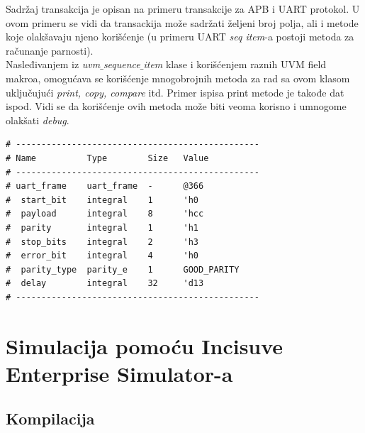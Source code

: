 Sadržaj transakcija je opisan na primeru transakcije za APB i UART protokol.
U ovom primeru se vidi da transackija može sadržati željeni broj polja, ali i
metode koje olakšavaju njeno korišćenje (u primeru UART \emph{seq item}-a
postoji metoda za računanje parnosti).\\





Nasleđivanjem iz \emph{uvm\(\_\)sequence\(\_\)item} klase i korišćenjem raznih
UVM field makroa, omogućava se korišćenje mnogobrojnih metoda za rad sa ovom
klasom uključujući \emph{print, copy, compare} itd.
Primer ispisa print metode je takođe dat ispod.
Vidi se da korišćenje ovih metoda može biti veoma korisno i umnogome olakšati \emph{debug}.\\

\begin{verbatim}
# ------------------------------------------------
# Name          Type        Size   Value
# ------------------------------------------------
# uart_frame    uart_frame  -      @366
#  start_bit    integral    1      'h0
#  payload      integral    8      'hcc
#  parity       integral    1      'h1
#  stop_bits    integral    2      'h3
#  error_bit    integral    4      'h0
#  parity_type  parity_e    1      GOOD_PARITY
#  delay        integral    32     'd13
# ------------------------------------------------
\end{verbatim}


\section{Simulacija pomoću Incisuve Enterprise Simulator-a}


\subsection{Kompilacija}

